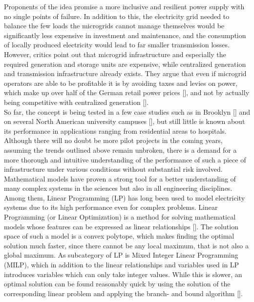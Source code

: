 \documentclass[
	11pt,								%
	DIV10,								%
	a4paper,         					%
	oneside,							%
	headheight=20pt,					%
	footheight=20pt,					%
    parskip=full,						%
    listof=totoc,						%
	bibliography=totoc,					%
	index=totoc,						%
]{scrartcl}
\begin{document}
Proponents of the idea promise a more inclusive and resilient power supply with no single points of failure. In addition to this, the electricity grid needed to balance the few loads the microgrids cannot manage themselves would be significantly less expensive in investment and maintenance, and the consumption of locally produced electricity would lead to far smaller transmission losses.
\\
However, critics point out that microgrid infrastructure and especially the required generation and storage units are expensive, while centralized generation and transmission infrastructure already exists. They argue that even if microgrid operators are able to be profitable it is by avoiding taxes and levies on power, which make up over half of the German retail power prices [\cite{Monitoringbericht20182018}], and not by actually being competitive with centralized generation [\cite{heindlIstEnergiewendeSozial2014}].
\\
So far, the concept is being tested in a few case studies such as in Brooklyn [\cite{mengelkampDesigningMicrogridEnergy2018}] and on several North American university campuses [\cite{chenowethRiseUniversityMicrogrids2018}], but still little is known about its performance in applications ranging from residential areas to hospitals.
\\
Although there will no doubt be more pilot projects in the coming years, assuming the trends outlined above remain unbroken, there is a demand for a more thorough and intuitive understanding of the performance of such a piece of infrastructure under various conditions without substantial risk involved.
\\
Mathematical models have proven a strong tool for a better understanding of many complex systems in the sciences but also in all engineering disciplines. Among them, Linear Programming (LP) has long been used to model electricity systems due to its high performance even for complex problems. Linear Programming (or Linear Optimization) is a method for solving mathematical models whose features can be expressed as linear relationships [\cite{goodarziLinearOptimization2014}]. The solution space of such a model is a convex polytope, which makes finding the optimal solution much faster, since there cannot be any local maximum, that is not also a global maximum. As subcategory of LP is Mixed Integer Linear Programming (MILP), which in addition to the linear relationships and variables used in LP introduces variables which can only take integer values. While this is slower, an optimal solution can be found reasonably quick by using the solution of the corresponding linear problem and applying the branch- and bound algorithm [\cite{MixedIntegerProgrammingMIP2018}]. 
\end{document}
